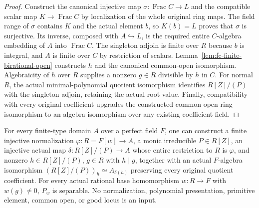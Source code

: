 \begin{proof}
Construct the canonical injective map $\sigma\colon\operatorname{Frac}C\to L$ and the compatible scalar map
$K\to\operatorname{Frac}C$ by localization of the whole original ring maps. The field range of $\sigma$
contains $K$ and the actual element $b$, so $K(b)=L$ proves that $\sigma$ is surjective. Its inverse, composed
with $A\hookrightarrow L$, is the required entire $C$-algebra embedding of $A$ into $\operatorname{Frac}C$.
The singleton adjoin is finite over $R$ because $b$ is integral, and $A$ is finite over $C$ by restriction of
scalars. Lemma~\ref{lem:fc-finite-birational-open} constructs $h$ and the canonical common-open isomorphism.
Algebraicity of $h$ over $R$ supplies a nonzero $g\in R$ divisible by $h$ in $C$.
For normal $R$, the actual minimal-polynomial quotient isomorphism identifies $R[Z]/(P)$ with the singleton
adjoin, retaining the actual root value. Finally, compatibility with every original coefficient upgrades the
constructed common-open ring isomorphism to an algebra isomorphism over any existing coefficient field.
\end{proof}

\begin{lemma}\label{lem:fc-monogenic-birational-presentation}
\leanok
{}
For every finite-type domain $A$ over a perfect field $F$, one can construct a finite injective normalization
$\varphi\colon R=F[w]\to A$, a monic irreducible $P\in R[Z]$, an injective actual map
$\delta\colon R[Z]/(P)\to A$ whose entire restriction to $R$ is $\varphi$, and nonzero $h\in R[Z]/(P)$,
$g\in R$ with $h\mid g$, together with an actual $F$-algebra isomorphism
$(R[Z]/(P))_h\simeq A_{\delta(h)}$ preserving every original quotient coefficient.
For every actual rational base homomorphism $w\colon R\to F$ with $w(g)\ne0$, $P_w$ is separable.
No normalization, polynomial presentation, primitive element, common open, or good locus is an input.
\end{lemma}

